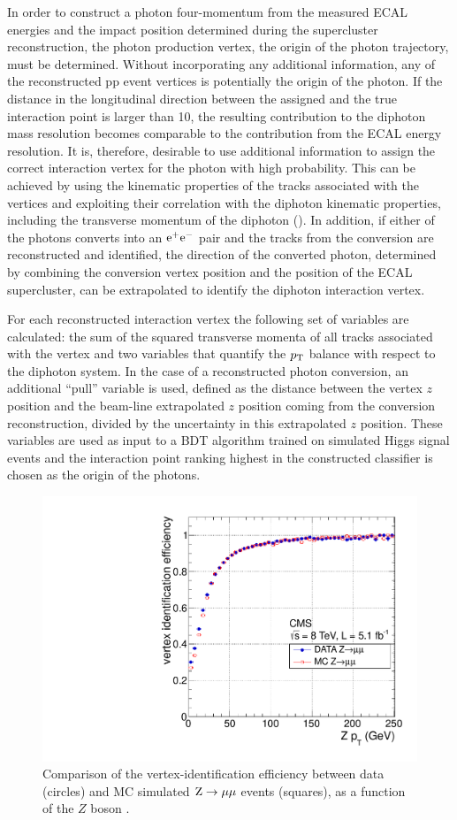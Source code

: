 \documentclass[12pt,twoside,a4paper,cmspaper,final,collab]{cms-tdr}
\begin{document}
In order to construct a photon four-momentum from the measured ECAL energies and the impact position
determined during the supercluster reconstruction, the photon production vertex, \ie the origin
of the photon trajectory, must be determined. Without incorporating any additional information, any of the
reconstructed pp event vertices is potentially the origin of the photon. If the distance
in the longitudinal direction
between the assigned and the true interaction point is
larger than 10\mm, the resulting contribution to the diphoton mass resolution becomes
comparable to the contribution from the ECAL energy resolution. It is, therefore, desirable
to use additional information to assign the correct interaction vertex for the photon with high probability.
This can be achieved by using the kinematic properties
of the tracks associated with the vertices and exploiting their correlation with
the diphoton kinematic properties, including the transverse momentum
of the diphoton
(\ptgg).
In addition, if either of the photons converts into an $\mathrm{e}^+\mathrm{e}^-$ pair
and the tracks from the conversion are reconstructed and identified, the direction of
the converted photon, determined by combining the conversion vertex position and the position of the
ECAL supercluster, can be extrapolated to identify the diphoton
interaction vertex.

For each reconstructed interaction vertex the following set of variables are calculated:
the sum of the squared transverse momenta of all tracks associated with the vertex
and two variables that  quantify the $p_{\mathrm{T}}$ balance with respect to the diphoton system.
In the case of a reconstructed photon conversion, an additional
 ``pull'' variable is used,
defined as the distance between the vertex $z$ position and the beam-line extrapolated $z$ position
coming from the conversion reconstruction, divided by the uncertainty in this extrapolated $z$ position.
These variables are used as input to a BDT algorithm trained on simulated Higgs signal events
and the interaction point ranking highest in the constructed classifier
is chosen as the origin of the photons.

\begin{figure}[htbp]
  \begin{center}
    \includegraphics[width=0.49\linewidth]{figures/hgg_vertex_efficiencyVsPt22June.pdf}
    \caption{
      Comparison of the vertex-identification efficiency between data (circles)
      and MC simulated $\mathrm{Z}\to\mu\mu$ events (squares), as a function of the $Z$ boson \pt.
    }
    \label{fig:hgg_vtxeff}
  \end{center}
\end{figure}
\end{document}
